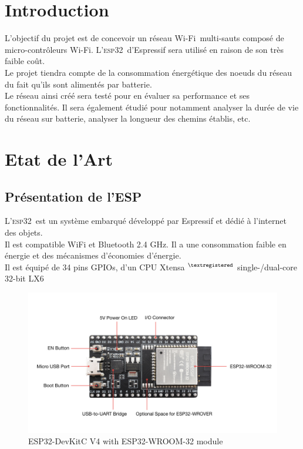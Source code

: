 \documentclass[a4paper, 12pt]{report}
\newcommand{\esp}{\textsc{esp32}}
\newcommand{\wifi}{Wi-Fi}
\begin{document}
\chapter*{Introduction}
    L'objectif du projet est de concevoir un réseau \wifi\ multi-sauts composé 
    de micro-contrôleurs \wifi. L'\esp\ d'Espressif sera utilisé en raison de 
    son très faible coût.\\
    Le projet tiendra compte de la consommation énergétique des noeuds du 
    réseau du fait qu'ils sont alimentés par batterie.\\
    Le réseau ainsi créé sera testé pour en évaluer sa performance et ses fonctionnalités. 
    Il sera également étudié pour notamment analyser la durée de vie du réseau 
    sur batterie, analyser la longueur des chemins établis, etc.

\tableofcontents
\newpage

\chapter{Etat de l'Art}
\section{Présentation de l'ESP}
    L'\esp\ est un système embarqué développé par Espressif et dédié à l'internet des objets.\\
    Il est compatible WiFi et Bluetooth 2.4 GHz. Il a une consommation faible en énergie et
    des mécanismes d'économies d'énergie.\\
    Il est équipé de 34 pins GPIOs, d'un CPU Xtensa $^{\tiny{\textregistered}}$ single-/dual-core 32-bit LX6
    \begin{figure}[H]
        \centering
        \includegraphics[scale=0.4]{images/esp32-devkitc.jpg}
        \caption{ESP32-DevKitC V4 with ESP32-WROOM-32 module \cite{esp32-gettingStarted_w}}
        \label{esp32_img}
    \end{figure}
\end{document}
